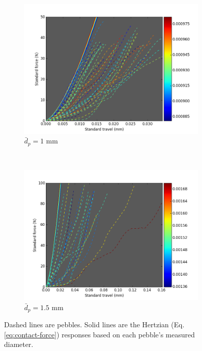 \begin{figure}
        \centering
        \begin{subfigure}[b]{\imagewidth}
                \includegraphics[width=\textwidth]{chapters/figures/nfri-1mm-data-w-ideal-hertz.png}
                \caption{$\bar{d}_p = 1$ mm}
                \label{fig:nfri-1-exp-colormap}
        \end{subfigure}
        ~
        \begin{subfigure}[b]{\imagewidth}
                \includegraphics[width=\textwidth]{chapters/figures/nfri-1.5mm-data-w-ideal-hertz.png}
                \caption{$\bar{d}_p = 1.5$ mm}
                \label{fig:nfri-1.5-exp-colormap}
        \end{subfigure}
        \caption{Dashed lines are \lit pebbles. Solid lines are the Hertzian (Eq.\ref{eq:contact-force}) responses based on each pebble's measured diameter.}\label{fig:nfri-exp-curves}
\end{figure}


